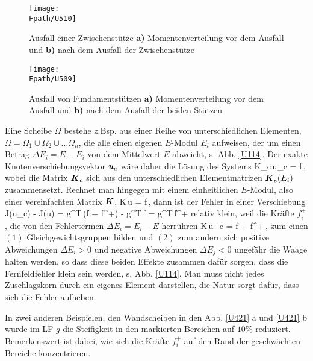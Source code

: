 {{%
\begin{figure}[tbp]
\centering
\texttt{[image: \\Fpath/U510]}
\caption{Ausfall einer Zwischenst\"{u}tze \textbf{ a)} Momentenverteilung vor dem Ausfall und \textbf{ b)} nach dem Ausfall der Zwischenst\"{u}tze}
\label{U510}
\end{figure}%
\begin{figure}[tbp]
\centering
\texttt{[image: \\Fpath/U509]}
\caption{Ausfall von Fundamentst\"{u}tzen \textbf{ a)} Momentenverteilung vor dem Ausfall und \textbf{ b)} nach dem Ausfall der beiden St\"{u}tzen}
\label{U509}
\end{figure}%
Eine Scheibe $\Omega$ bestehe z.Bsp. aus einer Reihe von
unterschiedlichen Elementen, $\Omega = \Omega_1 \cup \Omega_2 \cup \ldots \Omega_n$, die alle einen eigenen $E$-Modul $E_i$ aufweisen, der um einen Betrag $\Delta E_i = E - E_i$ von dem Mittelwert $E$ abweicht, s. Abb. \ref{U114}. Der exakte Knotenverschiebungsvektor $\mbox{\boldmath $u$}_c$ w\"{a}re daher die L\"{o}sung des Systems
\beq
\vek K_c\,\vek u_c = \vek f\,,
\eeq
wobei die Matrix  $\mbox{\boldmath $K$}_c$ sich aus den unterschiedlichen Elementmatrizen $\mbox{\boldmath $K$}_e(E_i)$ zusammensetzt. Rechnet man hingegen mit einem einheitlichen $E$-Modul, also einer vereinfachten Matrix $\mbox{\boldmath $K$}$,
\beq
\vek K\,\vek u = \vek f\,,
\eeq
dann ist der Fehler in einer Verschiebung
\beq
J(u_c) - J(u) = \vek g^T\,(\vek f + \vek f^+) -  \vek g^T\,\vek f = \vek g^T\,\vek f^+
\eeq
relativ klein, weil die Kr\"{a}fte $f_i^+$, die von den Fehlertermen $\Delta E_i = E_i - E$ herr\"{u}hren
\beq
\vek K\,\vek u_c = \vek f + \vek f^+\,,
\eeq
zum einen $(1)$ Gleichgewichtsgruppen bilden und $(2)$ zum andern sich positive Abweichungen $\Delta E_i > 0$ und negative Abweichungen $\Delta E_j < 0$ ungef\"{a}hr die Waage halten werden, so dass diese beiden Effekte zusammen daf\"{u}r sorgen, dass die Fernfeldfehler klein sein werden, s. Abb. \ref{U114}. Man muss nicht jedes Zuschlagskorn durch ein eigenes Element darstellen, die Natur sorgt daf\"{u}r, dass sich die Fehler aufheben.

In zwei anderen Beispielen, den Wandscheiben in den Abb. \ref{U421} a und \ref{U421} b wurde im LF $g$ die Steifigkeit in den markierten Bereichen auf $10 \%$ reduziert. Bemerkenswert ist dabei, wie sich die Kr\"{a}fte $f_i^+$ auf den Rand der geschw\"{a}chten Bereiche konzentrieren.

}}
